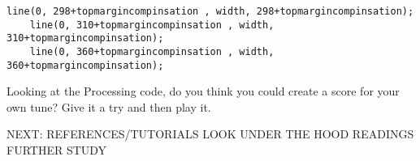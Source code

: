 \documentclass[twoside,a4paper]{refart}
\begin{document}
\begin{changemargin}{-1.5cm}{0.0cm} 
	\begin{lstlisting}[style=Processing]
	line(0, 298+topmargincompinsation , width, 298+topmargincompinsation);
	line(0, 310+topmargincompinsation , width, 310+topmargincompinsation);
	line(0, 360+topmargincompinsation , width, 360+topmargincompinsation);
	\end{lstlisting}
\end{changemargin}

Looking at the Processing code, do you think you could create a score for your own tune?  Give it a try and then play it.

NEXT:
REFERENCES/TUTORIALS
LOOK UNDER THE HOOD
READINGS
FURTHER STUDY






\printindex
\end{document}
